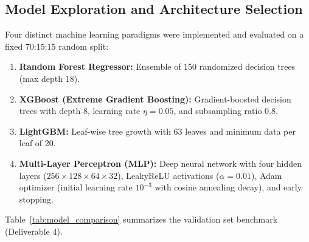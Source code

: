 \documentclass[11pt,a4paper]{article}
\begin{document}
\subsection{Model Exploration and Architecture Selection}
Four distinct machine learning paradigms were implemented and evaluated on a fixed 70:15:15 random split:
\begin{enumerate}
    \item \textbf{Random Forest Regressor:} Ensemble of 150 randomized decision trees (max depth 18).
    \item \textbf{XGBoost (Extreme Gradient Boosting):} Gradient-boosted decision trees with depth 8, learning rate $\eta = 0.05$, and subsampling ratio 0.8.
    \item \textbf{LightGBM:} Leaf-wise tree growth with 63 leaves and minimum data per leaf of 20.
    \item \textbf{Multi-Layer Perceptron (MLP):} Deep neural network with four hidden layers ($256 \times 128 \times 64 \times 32$), LeakyReLU activations ($\alpha = 0.01$), Adam optimizer (initial learning rate $10^{-3}$ with cosine annealing decay), and early stopping.
\end{enumerate}

Table~\ref{tab:model_comparison} summarizes the validation set benchmark (Deliverable 4).
\end{document}
